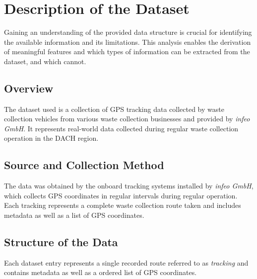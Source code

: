 \documentclass[a4paper,12pt,twoside]{scrreprt}
\begin{document}
\section{Description of the Dataset}
Gaining an understanding of the provided data structure is crucial for
identifying the available information and its limitations.
This analysis enables the derivation of meaningful features and which types of
information can be extracted from the dataset, and which cannot.

\subsection{Overview}
The dataset used is a collection of GPS tracking data collected by
waste collection vehicles from various waste collection businesses and provided
by \textit{infeo GmbH}. It represents real-world data
collected during regular waste collection operation in the DACH region.

\subsection{Source and Collection Method}
The data was obtained by the onboard tracking systems installed by
\textit{infeo GmbH},
which collects GPS coordinates in regular intervals during regular operation.
Each tracking represents a complete waste collection route taken and includes
metadata as well as a list of GPS coordinates.

\subsection{Structure of the Data}
Each dataset entry represents a single recorded route referred to as
\textit{tracking} and contains metadata as well as a ordered list of GPS
coordinates.
\end{document}
